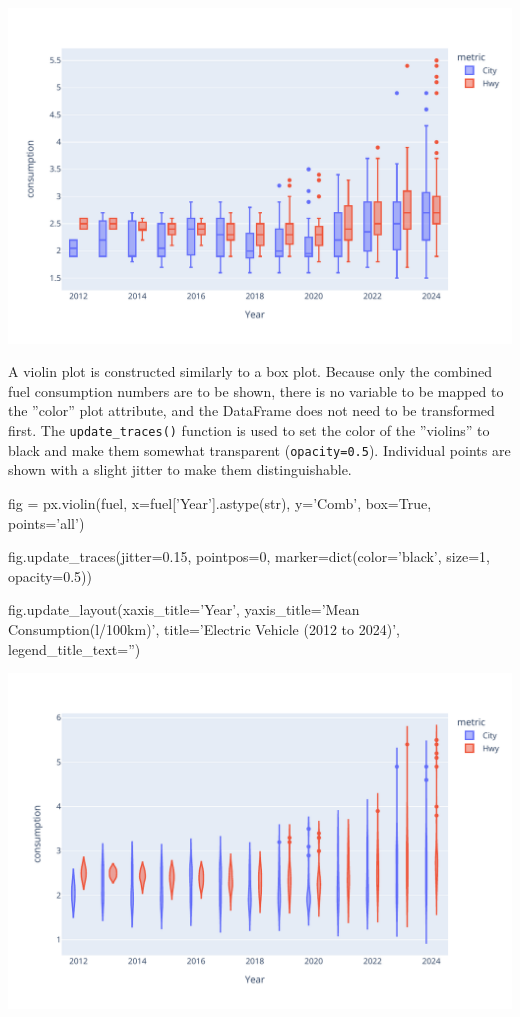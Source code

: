 \begin{center}
  \includegraphics[width=.8\textwidth]{px.fuel.box.pdf}
\end{center}

A violin plot is constructed similarly to a box plot. Because only the combined fuel consumption numbers are to be shown, there is no variable to be mapped to the ''color'' plot attribute, and the DataFrame does not need to be transformed first. The \texttt{update\_traces()} function is used to set the color of the ''violins'' to black and make them somewhat transparent (\texttt{opacity=0.5}). Individual points are shown with a slight jitter to make them distinguishable.

\begin{samepage}
\begin{pythoncode}
fig = px.violin(fuel, 
       x=fuel['Year'].astype(str), 
       y='Comb', box=True, 
       points='all')

fig.update_traces(jitter=0.15, pointpos=0, 
       marker=dict(color='black', size=1, opacity=0.5))

fig.update_layout(xaxis_title='Year',
       yaxis_title='Mean Consumption\n(l/100km)',
       title='Electric Vehicle (2012 to 2024)',
       legend_title_text='')
\end{pythoncode}
\end{samepage}

\begin{center}
  \includegraphics[width=.8\textwidth]{px.fuel.violin.pdf}
\end{center}

